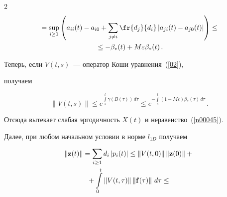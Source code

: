 \begin{multicols}{2}
\begin{multline*}
{}= \sup_{i \ge 1} \left(a_{ii} (t)- a_{i0} +


\sum_{j \neq i} \fr{d_j}{d_i}\left|a_{ji} (t)- a_{j0} (t)\right|


\right) \le{}\\


{}\le -\beta_* (t) + M\varepsilon \beta_* (t)\,. 




\end{multline*}





Теперь, если  $V(t,s)$~--- оператор Коши уравнения~(\ref{02}),


получаем


\begin{equation*}


\left\|V(t,s)\right\| \le e^{\int\limits_s^t\gamma \left(B(\tau)\right)\,


d\tau} \le  e^{-\int\limits_s^t\left(1- M\varepsilon\right) \beta_*


(\tau)\, d\tau}\,. 




\end{equation*}





Отсюда вытекает слабая эргодичность  $X(t)$ и неравенство~(\ref{n00045}).





Далее, при любом начальном условии в норме  $l_{1D}$ получаем





\vspace*{-1pt}





\noindent


\begin{multline*}


\left\|{\bf z}(t)\right\| =  \sum_{i \ge 1} d_i \left|p_i(t)\right|


\le \left\|V(t,0)\right\| \left\|{\bf z}(0)\right\| +{}\\[-1pt]


{}+ \int\limits_0^t


\left\|V(t,\tau)\right\| \left\|{\bf f}(\tau)\right\|\, d\tau \le{}\\[-1pt]



\end{multline*}
\end{multicols}
